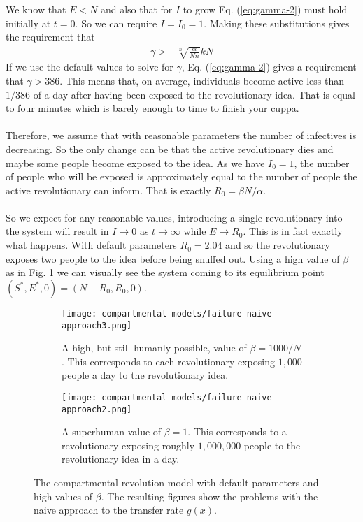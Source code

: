 We know that $E<N$ and also that for $I$ to grow Eq. (\ref{eq:gamma-2}) must hold initially at $t=0$. So we can require $I=I_0=1$. Making these substitutions gives the requirement that
\begin{align*}
\gamma >& \sqrt[n]{\frac{\alpha}{N n}}k N
\end{align*}
If we use the default values to solve for $\gamma$, Eq. (\ref{eq:gamma-2}) gives a requirement that $\gamma>386$. This means that, on average, individuals become active less than $1/386$ of a day after having been exposed to the revolutionary idea. That is equal to four minutes which is barely enough to time to finish your cuppa.\\
\\
Therefore, we assume that with reasonable parameters the number of infectives is decreasing. So the only change can be that the active revolutionary dies and maybe some people become exposed to the idea. As we have $I_0=1$, the number of people who will be exposed is approximately equal to the number of people the active revolutionary can inform. That is exactly $R_0=\beta N/\alpha$.\\
\\
So we expect for any reasonable values, introducing a single revolutionary into the system will result in $I\rightarrow0$ as $t\rightarrow\infty$ while $E\rightarrow R_0$. This is in fact exactly what happens. With default parameters $R_0=2.04$ and so the revolutionary exposes two people to the idea before being snuffed out. Using a high value of $\beta$ as in Fig. \ref{fig:rev-naive-beta-high} we can visually see the system coming to its equilibrium point $(S^*,E^*,0)=(N-R_0,R_0,0)$.
\begin{figure}[!h]
	\centering
	\begin{subfigure}{0.8\textwidth}
	\texttt{[image: compartmental-models/failure-naive-approach3.png]}
	\caption{A high, but still humanly possible, value of $\beta=1000/N$. This corresponds to each revolutionary exposing $1,000$ people a day to the revolutionary idea.}
	\label{fig:rev-naive-beta-high}
	\end{subfigure}
	\begin{subfigure}{0.8\textwidth}
		\texttt{[image: compartmental-models/failure-naive-approach2.png]}
		\caption{A superhuman value of $\beta=1$. This corresponds to a revolutionary exposing roughly $1,000,000$ people to the revolutionary idea in a day.}
		\label{fig:rev-naive-beta-vhigh}
	\end{subfigure}
\caption{The compartmental revolution model with default parameters and high values of $\beta$. The resulting figures show the problems with the naive approach to the transfer rate $g(x)$.}
\end{figure}
